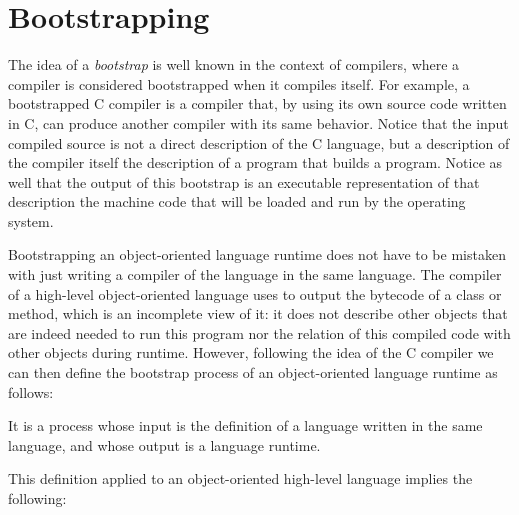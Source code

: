 \section{Bootstrapping}\label{sec:bootstrapping}

The idea of a \emph{bootstrap} is well known in the context of compilers, where a compiler is considered bootstrapped when it compiles itself. For example, a bootstrapped C compiler is a compiler that, by using its own source code written in C, can produce another compiler with its same behavior. Notice that the input compiled source is not a direct description of the C language, but a description of the compiler itself \ie the description of a program that builds a program. Notice as well that the output of this bootstrap is an executable representation of that description \ie the machine code that will be loaded and run by the operating system.

Bootstrapping an object-oriented language runtime does not have to be mistaken with just writing a compiler of the language in the same language. The compiler of a high-level object-oriented language uses to output the bytecode of a class or method, which is an incomplete view of it: it does not describe other objects that are indeed needed to run this program nor the relation of this compiled code with other objects during runtime. However, following the idea of the C compiler we can then define the bootstrap process of an object-oriented language runtime as follows:

\begin{definition}
It is a process whose input is the definition of a language written in the same language, and whose output is a language runtime.
\end{definition}

This definition applied to an object-oriented high-level language implies the following:

